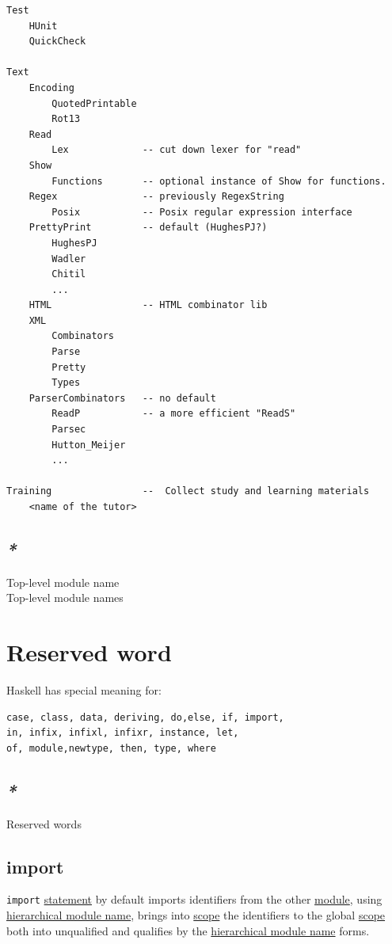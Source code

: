 \documentclass[a4paper,14pt,oneside]{book}
\begin{document}
{\begin{verbatim}
Test
    HUnit
    QuickCheck

Text
    Encoding
        QuotedPrintable
        Rot13
    Read
        Lex             -- cut down lexer for "read"
    Show
        Functions       -- optional instance of Show for functions.
    Regex               -- previously RegexString
        Posix           -- Posix regular expression interface
    PrettyPrint         -- default (HughesPJ?)
        HughesPJ
        Wadler
        Chitil
        ...
    HTML                -- HTML combinator lib
    XML
        Combinators
        Parse
        Pretty
        Types
    ParserCombinators   -- no default
        ReadP           -- a more efficient "ReadS"
        Parsec
        Hutton_Meijer
        ...

Training                --  Collect study and learning materials
    <name of the tutor>
\end{verbatim}

\subsection{\emph{*}}
\label{sec:org54053f8}
\label{org2fc3e7e}Top-level module name\\
\label{orgff79fe9}Top-level module names\\

\section{\label{org3a3c711}Reserved word}
\label{sec:orge706e40}
Haskell has special meaning for:\\
\begin{verbatim}
case, class, data, deriving, do,else, if, import,
in, infix, infixl, infixr, instance, let,
of, module,newtype, then, type, where
\end{verbatim}

\subsection{\emph{*}}
\label{sec:org26d5370}
\label{orgf04be40}Reserved words\\

\subsection{\label{org7dc0f80}import}
\label{sec:org74b969d}
\texttt{import} \hyperref[org03c7362]{statement} by default imports identifiers from the other \hyperref[org240ade3]{module}, using \hyperref[org75004c8]{hierarchical module name}, brings into \hyperref[orgd4e671a]{scope} the identifiers to the global \hyperref[orgd4e671a]{scope} both into unqualified and qualifies by the \hyperref[org75004c8]{hierarchical module name} forms.\\

}
\end{document}
